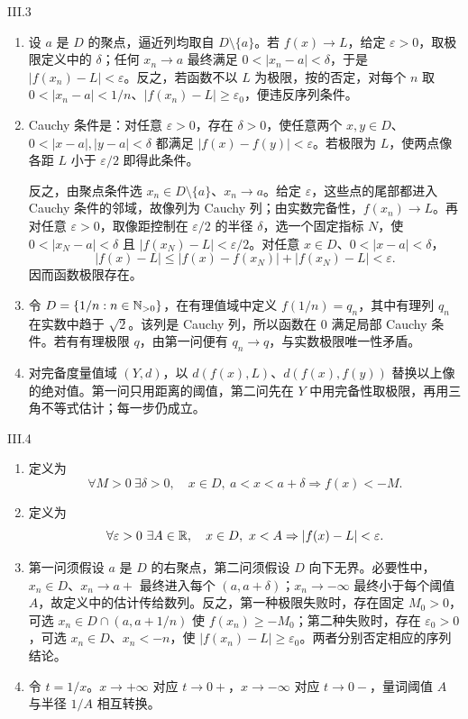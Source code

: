 \begin{solution}{III.3}
\begin{enumerate}
 \item 设 \(a\) 是 \(D\) 的聚点，逼近列均取自 \(D\setminus\{a\}\)。若 \(f(x)\to L\)，给定 \(\varepsilon>0\)，取极限定义中的 \(\delta\)；任何 \(x_n\to a\) 最终满足 \(0<|x_n-a|<\delta\)，于是 \(|f(x_n)-L|<\varepsilon\)。反之，若函数不以 \(L\) 为极限，按的否定，对每个 \(n\) 取 \(0<|x_n-a|<1/n\)、\(|f(x_n)-L|\ge\varepsilon_0\)，便违反序列条件。
 \item Cauchy 条件是：对任意 \(\varepsilon>0\)，存在 \(\delta>0\)，使任意两个 \(x,y\in D\)、\(0<|x-a|,|y-a|<\delta\) 都满足 \(|f(x)-f(y)|<\varepsilon\)。若极限为 \(L\)，使两点像各距 \(L\) 小于 \(\varepsilon/2\) 即得此条件。

 反之，由聚点条件选 \(x_n\in D\setminus\{a\}\)、\(x_n\to a\)。给定 \(\varepsilon\)，这些点的尾部都进入 Cauchy 条件的邻域，故像列为 Cauchy 列；由实数完备性，\(f(x_n)\to L\)。再对任意 \(\varepsilon>0\)，取像距控制在 \(\varepsilon/2\) 的半径 \(\delta\)，选一个固定指标 \(N\)，使 \(0<|x_N-a|<\delta\) 且 \(|f(x_N)-L|<\varepsilon/2\)。对任意 \(x\in D\)、\(0<|x-a|<\delta\)，
 \[
 |f(x)-L|\le|f(x)-f(x_N)|+|f(x_N)-L|<\varepsilon.
 \]
 因而函数极限存在。
 \item 令 \(D=\{1/n:n\in\mathbb{N}_{>0}\}\)，在有理值域中定义 \(f(1/n)=q_n\)，其中有理列 \(q_n\) 在实数中趋于 \(\sqrt2\)。该列是 Cauchy 列，所以函数在 \(0\) 满足局部 Cauchy 条件。若有有理极限 \(q\)，由第一问便有 \(q_n\to q\)，与实数极限唯一性矛盾。
 \item 对完备度量值域 \((Y,d)\)，以 \(d(f(x),L)\)、\(d(f(x),f(y))\) 替换以上像的绝对值。第一问只用距离的阈值，第二问先在 \(Y\) 中用完备性取极限，再用三角不等式估计；每一步仍成立。
\end{enumerate}
\end{solution}

\begin{solution}{III.4}
\begin{enumerate}
 \item 定义为
 \[
  \forall M>0\ \exists\delta>0,\quad
  x\in D,\ a<x<a+\delta\Rightarrow f(x)<-M.
 \]
 \item 定义为
 \[
  \forall\varepsilon>0\ \exists A\in\R,\quad
  x\in D,\ x<A\Rightarrow\abs{f(x)-L}<\varepsilon.
 \]
 \item 第一问须假设 \(a\) 是 \(D\) 的右聚点，第二问须假设 \(D\) 向下无界。必要性中，\(x_n\in D\)、\(x_n\to a+\) 最终进入每个 \((a,a+\delta)\)；\(x_n\to-\infty\) 最终小于每个阈值 \(A\)，故定义中的估计传给数列。反之，第一种极限失败时，存在固定 \(M_0>0\)，可选 \(x_n\in D\cap(a,a+1/n)\) 使 \(f(x_n)\ge-M_0\)；第二种失败时，存在 \(\varepsilon_0>0\)，可选 \(x_n\in D\)、\(x_n<-n\)，使 \(|f(x_n)-L|\ge\varepsilon_0\)。两者分别否定相应的序列结论。
 \item 令 \(t=1/x\)。\(x\to+\infty\) 对应 \(t\to0+\)，\(x\to-\infty\) 对应 \(t\to0-\)，量词阈值 \(A\) 与半径 \(1/A\) 相互转换。
\end{enumerate}
\end{solution}

